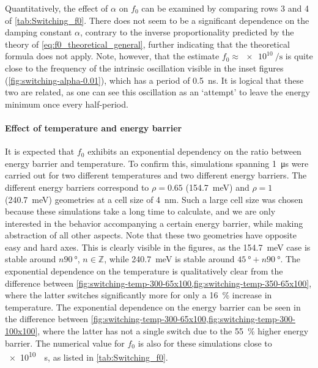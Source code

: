 \documentclass[11pt,a4paper,english]{article}
\begin{document}
Quantitatively, the effect of $\alpha$ on $f_0$ can be examined by comparing rows 3 and 4 of \cref{tab:Switching_f0}. There does not seem to be a significant dependence on the damping constant $\alpha$, contrary to the inverse proportionality predicted by the theory of \cref{eq:f0_theoretical_general}, further indicating that the theoretical formula does not apply. Note, however, that the estimate $f_0\approx\SI{e10}{\per\second}$ is quite close to the frequency of the intrinsic oscillation visible in the inset figures (\cref{fig:switching-alpha-0.01}), which has a period of \SI{0.5}{\nano\second}. It is logical that these two are related, as one can see this oscillation as an `attempt' to leave the energy minimum once every half-period.

\FloatBarrier
\paragraph{Effect of temperature and energy barrier}
It is expected that $f_0$ exhibits an exponential dependency on the ratio between energy barrier and temperature. To confirm this, simulations spanning \SI{1}{\micro\second} were carried out for two different temperatures and two different energy barriers. The different energy barriers correspond to $\rho=0.65$ (\SI{154.7}{\milli\electronvolt}) and $\rho=1$ (\SI{240.7}{\milli\electronvolt}) geometries at a cell size of \SI{4}{\nano\metre}. Such a large cell size was chosen because these simulations take a long time to calculate, and we are only interested in the behavior accompanying a certain energy barrier, while making abstraction of all other aspects. Note that these two geometries have opposite easy and hard axes. This is clearly visible in the figures, as the \SI{154.7}{\milli\electronvolt} case is stable around $n\SI{90}{\degree}$, $n \in \mathbb{Z}$, while \SI{240.7}{\milli\electronvolt} is stable around $\SI{45}{\degree} + n\SI{90}{\degree}$. The exponential dependence on the temperature is qualitatively clear from the difference between \cref{fig:switching-temp-300-65x100,fig:switching-temp-350-65x100}, where the latter switches significantly more for only a \SI{16}{\percent} increase in temperature. The exponential dependence on the energy barrier can be seen in the difference between \cref{fig:switching-temp-300-65x100,fig:switching-temp-300-100x100}, where the latter has not a single switch due to the \SI{55}{\percent} higher energy barrier. The numerical value for $f_0$ is also for these simulations close to \SI{e10}{\per\second}, as listed in \cref{tab:Switching_f0}.
\end{document}
